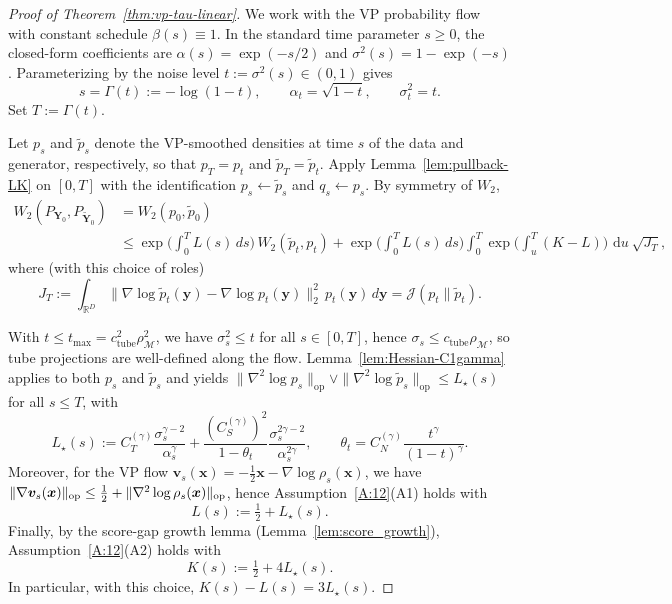 \documentclass[12pt]{article}
\theoremstyle{definition} %
\newcommand{\R}{\mathbb{R}}
\newcommand{\dd}{\,\mathrm{d}}
\newcommand{\M}{\mathcal{M}}
\begin{document}
\begin{proof}[Proof of Theorem~\ref{thm:vp-tau-linear}]
We work with the VP probability flow with constant schedule $\beta(s)\equiv 1$.
In the standard time parameter $s\ge 0$, the closed-form coefficients are
$\alpha(s)=\exp(-s/2)$ and $\sigma^2(s)=1-\exp(-s)$.
Parameterizing by the noise level $t:=\sigma^2(s)\in(0,1)$ gives
\begin{equation}\label{eq:Gamma-def}
s=\Gamma(t):=-\log(1-t),\qquad \alpha_t=\sqrt{1-t},\qquad \sigma_t^2=t.
\end{equation}
Set $T:=\Gamma(t)$.

Let $p_s$ and $\tilde p_s$ denote the VP-smoothed densities at time $s$ of
the data and generator, respectively, so that $p_T=p_t$ and $\tilde p_T=\tilde p_t$.
Apply Lemma~\ref{lem:pullback-LK} on $[0,T]$ with the identification
$p_s \leftarrow \tilde p_s$ and $q_s \leftarrow p_s$.
By symmetry of $W_2$,
\begin{align*}
W_2(P_{\bm Y_0},P_{\tilde{\bm Y}_0})
&=W_2(p_0,\tilde p_0)\\
&\le \exp\!\Big(\int_0^{T}\!L(s)\,ds\Big)\,W_2(\tilde p_t,p_t)
+\exp\!\Big(\int_0^{T}\!L(s)\,ds\Big)\int_0^{T}\!
\exp\!\Big(\int_u^{T}(K-L)\Big)\,\dd u\ \sqrt{J_T},
\end{align*}
where (with this choice of roles)
\[
J_T
:=\int_{\R^D}\bigl\|\nabla\log \tilde p_t(\bm y)-\nabla\log p_t(\bm y)\bigr\|_2^2\,p_t(\bm y)\,d\bm y
=\mathcal{J}(p_t\|\tilde p_t).
\]

With $t\le t_{\max}=c_{\mathrm{tube}}^2\rho_{\M}^2$, we have $\sigma_s^2\le t$ for all $s\in[0,T]$,
hence $\sigma_s\le c_{\mathrm{tube}}\rho_{\M}$, so tube projections are well-defined along the flow.
Lemma~\ref{lem:Hessian-C1gamma} applies to both $p_s$ and $\tilde p_s$ and yields
$\|\nabla^2\log p_s\|_{\mathrm{op}}\vee\|\nabla^2\log \tilde p_s\|_{\mathrm{op}}\le L_\star(s)$
for all $s\le T$, with
\[
L_\star(s):=C_T^{(\gamma)}\frac{\sigma_s^{\gamma-2}}{\alpha_s^{\gamma}}
+\frac{(C_S^{(\gamma)})^2}{1-\theta_t}\frac{\sigma_s^{2\gamma-2}}{\alpha_s^{2\gamma}},
\qquad
\theta_t=C_N^{(\gamma)}\frac{t^{\gamma}}{(1-t)^{\gamma}}.
\]
Moreover, for the VP flow $\bm v_s(\bm x)= -\tfrac12 \bm x - \nabla\log\rho_s(\bm x)$, we have
$\|\nabla \bm v_s(\bm x)\|_{\rm op}\le \tfrac12+\|\nabla^2\log\rho_s(\bm x)\|_{\rm op}$, hence
Assumption~\ref{A:12}(A1) holds with
\[
L(s):=\tfrac12+L_\star(s).
\]
Finally, by the score-gap growth lemma (Lemma~\ref{lem:score_growth}),
Assumption~\ref{A:12}(A2) holds with
\[
K(s):=\tfrac12+4L_\star(s).
\]
In particular, with this choice, $K(s)-L(s)=3L_\star(s)$.


\end{proof}
\end{document}
